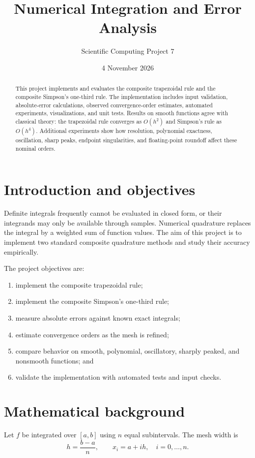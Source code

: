 \documentclass[11pt]{article}
\title{Numerical Integration and Error Analysis}
\author{Scientific Computing Project 7}
\date{4 November 2026}
\begin{document}
\maketitle
\begin{abstract}
This project implements and evaluates the composite trapezoidal rule and the composite Simpson's one-third rule. The implementation includes input validation, absolute-error calculations, observed convergence-order estimates, automated experiments, visualizations, and unit tests. Results on smooth functions agree with classical theory: the trapezoidal rule converges as $O(h^2)$ and Simpson's rule as $O(h^4)$. Additional experiments show how resolution, polynomial exactness, oscillation, sharp peaks, endpoint singularities, and floating-point roundoff affect these nominal orders.
\end{abstract}

\tableofcontents

\section{Introduction and objectives}
Definite integrals frequently cannot be evaluated in closed form, or their integrands may only be available through samples. Numerical quadrature replaces the integral by a weighted sum of function values. The aim of this project is to implement two standard composite quadrature methods and study their accuracy empirically.

The project objectives are:
\begin{enumerate}
  \item implement the composite trapezoidal rule;
  \item implement the composite Simpson's one-third rule;
  \item measure absolute errors against known exact integrals;
  \item estimate convergence orders as the mesh is refined;
  \item compare behavior on smooth, polynomial, oscillatory, sharply peaked, and nonsmooth functions; and
  \item validate the implementation with automated tests and input checks.
\end{enumerate}

\section{Mathematical background}
Let $f$ be integrated over $[a,b]$ using $n$ equal subintervals. The mesh width is
\[
 h=\frac{b-a}{n},\qquad x_i=a+ih,\quad i=0,\ldots,n.
\]
\end{document}
